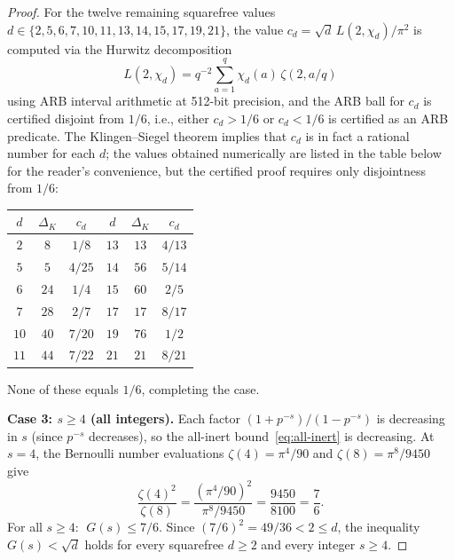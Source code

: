 \documentclass[12pt,reqno]{amsart}
\theoremstyle{plain}
\theoremstyle{definition}
\theoremstyle{remark}
\begin{document}
\begin{proof}
For the twelve remaining squarefree values $d \in \{2, 5, 6, 7, 10, 11, 13, 14, 15, 17, 19, 21\}$, the value $c_d = \sqrt{d}\,L(2,\chi_d)/\pi^2$ is computed via the Hurwitz decomposition
\[
  L(2,\chi_d) = q^{-2}\sum_{a=1}^{q}\chi_d(a)\,\zeta(2,a/q)
\]
using ARB interval arithmetic at 512-bit precision, and the ARB ball for $c_d$ is certified disjoint from $1/6$, i.e., either $c_d > 1/6$ or $c_d < 1/6$ is certified as an ARB predicate.  The Klingen--Siegel theorem implies that $c_d$ is in fact a rational number for each $d$; the values obtained numerically are listed in the table below for the reader's convenience, but the certified proof requires only disjointness from $1/6$:
\nopagebreak[4]
\begin{center}
\renewcommand{\arraystretch}{1.15}
\smallskip
\small
\begin{tabular}{ccc@{\qquad\qquad}ccc}
\toprule
$d$ & $\Delta_K$ & $c_d$ & $d$ & $\Delta_K$ & $c_d$ \\
\midrule
$2$  & $8$  & $1/8$  & $13$ & $13$ & $4/13$ \\
$5$  & $5$  & $4/25$ & $14$ & $56$ & $5/14$ \\
$6$  & $24$ & $1/4$  & $15$ & $60$ & $2/5$  \\
$7$  & $28$ & $2/7$  & $17$ & $17$ & $8/17$ \\
$10$ & $40$ & $7/20$ & $19$ & $76$ & $1/2$  \\
$11$ & $44$ & $7/22$ & $21$ & $21$ & $8/21$ \\
\bottomrule
\end{tabular}
\smallskip
\end{center}
\normalsize
None of these equals $1/6$, completing the case.

\medskip\noindent\textbf{Case 3: $s \geq 4$ (all integers).}
Each factor $(1+p^{-s})/(1-p^{-s})$ is decreasing in $s$ (since $p^{-s}$ decreases), so the all-inert bound~\eqref{eq:all-inert} is decreasing.  At $s = 4$, the Bernoulli number evaluations $\zeta(4) = \pi^4/90$ and $\zeta(8) = \pi^8/9450$ give
\[
  \frac{\zeta(4)^2}{\zeta(8)} = \frac{(\pi^4/90)^2}{\pi^8/9450} = \frac{9450}{8100} = \frac{7}{6}.
\]
For all $s \geq 4$: $\;G(s) \leq 7/6$.  Since $(7/6)^2 = 49/36 < 2 \leq d$, the inequality $G(s) < \sqrt{d}$ holds for every squarefree $d \geq 2$ and every integer $s \geq 4$.


\end{proof}
\end{document}
